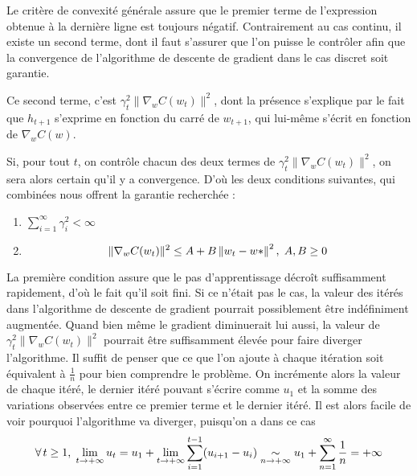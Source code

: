 \documentclass{article}
\begin{document}
Le critère de convexité générale assure que le premier terme de l'expression obtenue à la dernière ligne est toujours négatif. Contrairement au cas continu, il existe un second terme, dont il faut s'assurer que l'on puisse le contrôler afin que la convergence de l'algorithme de descente de gradient dans le cas discret soit garantie.
\bigskip

Ce second terme, c'est $\gamma_t^{2} \lVert \nabla_wC(w_t) \rVert^{2}$, dont la présence s'explique par le fait que $h_{t+1}$ s'exprime en fonction du carré de $w_{t+1}$, qui lui-même s'écrit en fonction de $\nabla_wC(w)$.
\bigskip

Si, pour tout $t$, on contrôle chacun des deux termes de $\gamma_t^{2} \lVert \nabla_wC(w_t) \rVert^{2}$, on sera alors certain qu'il y a convergence. D'où les deux conditions suivantes, qui combinées nous offrent la garantie recherchée : \bigskip
\begin{enumerate}
    \item $\sum_{i=1}^{\infty} \gamma_i^{2} < \infty$
    \item \begin{equation} \label{eq(4.16)}
        \lVert \nabla_wC(w_t) \rVert^{2} \leq A + B\left\|w_t - w*\right\|^2, \hspace{0.1cm} A, B \geq 0
    \end{equation}
\end{enumerate}
\bigskip

La première condition assure que le pas d'apprentissage décroît suffisamment rapidement, d'où le fait qu'il soit fini. Si ce n'était pas le cas, la valeur des itérés dans l'algorithme de descente de gradient pourrait possiblement être indéfiniment augmentée. Quand bien même le gradient diminuerait lui aussi, la valeur de $\gamma_t^{2} \lVert \nabla_wC(w_t) \rVert^{2}$ pourrait être suffisamment élevée pour faire diverger l'algorithme. Il suffit de penser que ce que l'on ajoute à chaque itération soit équivalent à $\frac{1}{n}$ pour bien comprendre le problème. On incrémente alors la valeur de chaque itéré, le dernier itéré pouvant s'écrire comme $u_1$ et la somme des variations observées entre ce premier terme et le dernier itéré. Il est alors facile de voir pourquoi l'algorithme va diverger, puisqu'on a dans ce cas
\begin{equation*}
    \forall \hspace{0.05cm} t \geq 1, \hspace{0.1cm} \lim_{t\to+\infty} u_t = u_1 + \lim_{t\to+\infty} \sum_{i=1}^{t-1} (u_{i+1} - u_i) \underset{n \rightarrow{+\infty}}{\sim} u_1 + \sum_{n=1}^{\infty} \frac{1}{n} = +\infty
\end{equation*}
\end{document}

